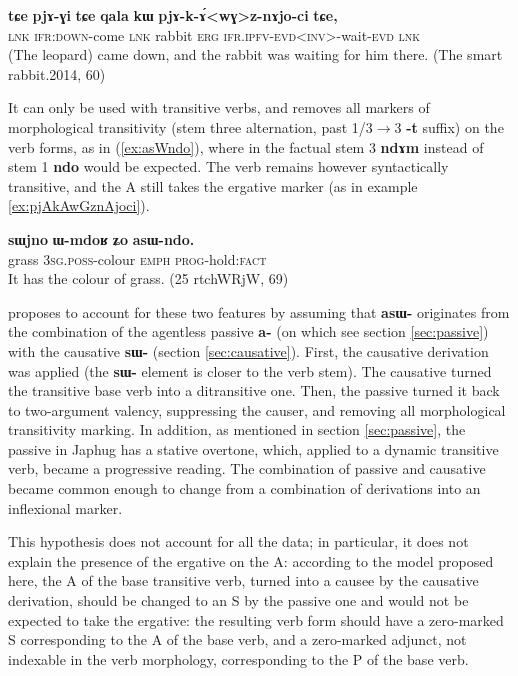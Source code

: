 \documentclass[oldfontcommands,oneside,a4paper,11pt]{article}
\newcommand{\ipa}[1]{\mbox{\phon\textbf{#1}}} %
\begin{document}
\begin{exe}
\ex \label{ex:pjAkAwGznAjoci}
\gll
\ipa{tɕe} 	\ipa{pjɤ-ɣi} 	\ipa{tɕe} 	\ipa{qala} 	\ipa{kɯ} 	\ipa{pjɤ-k-ɤ́<wɣ>z-nɤjo-ci} 	\ipa{tɕe,} \\
\textsc{lnk} \textsc{ifr:down}-come \textsc{lnk} rabbit \textsc{erg} \textsc{ifr.ipfv-evd<inv>}-wait-\textsc{evd} \textsc{lnk} \\
\glt (The leopard) came down, and the rabbit was waiting for him there. (The smart rabbit.2014, 60)
\end{exe}

It can only be used with transitive verbs, and removes all markers of morphological transitivity (stem three alternation, past 1/3$\rightarrow$3 \ipa{-t} suffix) on the verb forms, as in (\ref{ex:asWndo}), where in the factual stem 3 \ipa{ndɤm} instead of stem 1 \ipa{ndo} would be expected. The verb remains however syntactically transitive, and the A still takes the ergative marker (as in example \ref{ex:pjAkAwGznAjoci}).


\begin{exe}
\ex \label{ex:asWndo}
\gll
\ipa{sɯjno} 	\ipa{ɯ-mdoʁ} 	\ipa{ʑo} 	\ipa{asɯ-ndo.} \\
grass \textsc{3sg.poss}-colour \textsc{emph} \textsc{prog}-hold:\textsc{fact} \\
\glt It has the colour of grass. (25 rtchWRjW, 69)
\end{exe}

\citet{jacques16prog} proposes to account for these two features by assuming that \ipa{asɯ-} originates from the combination of the agentless passive \ipa{a-} (on which see section \ref{sec:passive}) with the causative \ipa{sɯ-} (section \ref{sec:causative}). First, the causative derivation was applied (the \ipa{sɯ-} element is closer to the verb stem). The causative turned the transitive base verb into a ditransitive one. Then, the passive turned it back to two-argument valency, suppressing the causer, and removing all morphological transitivity marking. In addition, as mentioned in section \ref{sec:passive}, the passive in Japhug  has a stative overtone, which, applied to a dynamic transitive verb, became a progressive reading. The combination of passive and causative became common enough to change from a combination of derivations into an inflexional marker.

This hypothesis does not account for all the data; in particular, it does not explain the presence of the ergative on the A: according to the model proposed here, the A of the base transitive verb, turned into a causee by the causative derivation, should be changed to an S by the passive one and would not be expected to take the ergative: the resulting verb form should have a zero-marked S corresponding to the A of the base verb, and a zero-marked adjunct, not indexable in the verb morphology, corresponding to the P of the base verb.  
\end{document}

